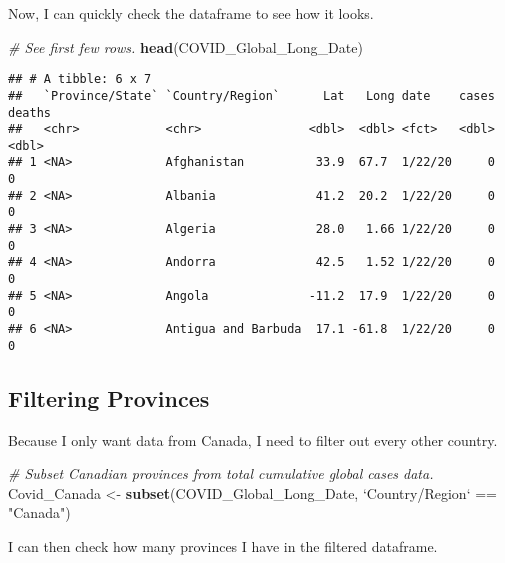 \documentclass[]{tufte-handout}
\newenvironment{Shaded}{}{}
\newcommand{\CommentTok}[1]{\textcolor[rgb]{0.38,0.63,0.69}{\textit{#1}}}
\newcommand{\DataTypeTok}[1]{\textcolor[rgb]{0.56,0.13,0.00}{#1}}
\newcommand{\KeywordTok}[1]{\textcolor[rgb]{0.00,0.44,0.13}{\textbf{#1}}}
\newcommand{\NormalTok}[1]{#1}
\newcommand{\OperatorTok}[1]{\textcolor[rgb]{0.40,0.40,0.40}{#1}}
\newcommand{\StringTok}[1]{\textcolor[rgb]{0.25,0.44,0.63}{#1}}
\begin{document}
Now, I can quickly check the dataframe to see how it looks.

\begin{Shaded}
\begin{Highlighting}[]
\CommentTok{# See first few rows.}
\KeywordTok{head}\NormalTok{(COVID_Global_Long_Date)}
\end{Highlighting}
\end{Shaded}

\begin{verbatim}
## # A tibble: 6 x 7
##   `Province/State` `Country/Region`      Lat   Long date    cases deaths
##   <chr>            <chr>               <dbl>  <dbl> <fct>   <dbl>  <dbl>
## 1 <NA>             Afghanistan          33.9  67.7  1/22/20     0      0
## 2 <NA>             Albania              41.2  20.2  1/22/20     0      0
## 3 <NA>             Algeria              28.0   1.66 1/22/20     0      0
## 4 <NA>             Andorra              42.5   1.52 1/22/20     0      0
## 5 <NA>             Angola              -11.2  17.9  1/22/20     0      0
## 6 <NA>             Antigua and Barbuda  17.1 -61.8  1/22/20     0      0
\end{verbatim}

\hypertarget{filtering-provinces}{%
\subsection{Filtering Provinces}\label{filtering-provinces}}

Because I only want data from Canada, I need to filter out every other
country.

\begin{Shaded}
\begin{Highlighting}[]
\CommentTok{# Subset Canadian provinces from total cumulative global cases data.}
\NormalTok{Covid_Canada <-}\StringTok{ }\KeywordTok{subset}\NormalTok{(COVID_Global_Long_Date, }\StringTok{`}\DataTypeTok{Country/Region}\StringTok{`} \OperatorTok{==}\StringTok{ "Canada"}\NormalTok{)}
\end{Highlighting}
\end{Shaded}

I can then check how many provinces I have in the filtered dataframe.

\begin{Shaded}
\end{Shaded}
\end{document}
